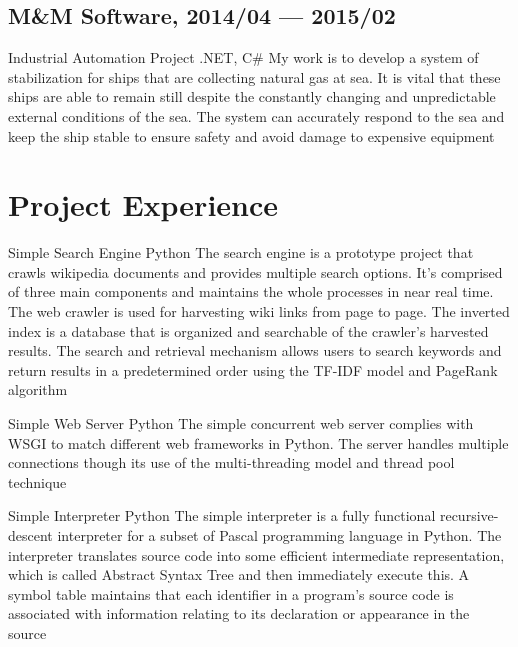 \documentclass[11pt,a4paper]{moderncv}
\begin{document}
\subsection{M\&M Software, 2014/04 --- 2015/02}
\renewcommand{\baselinestretch}{1.0}
\cventry{}
{Industrial Automation Project}
{.NET, C\#}
{}{}
{
My work is to develop a system of stabilization for ships that are collecting natural gas at sea. It is vital that these ships are able to remain still despite the constantly changing and unpredictable external conditions of the sea. The system can accurately respond to the sea and keep the ship stable to ensure safety and avoid damage to expensive equipment
}


\section{Project Experience}
\cventry{}
{Simple Search Engine}
{Python}
{}{}
{
The search engine is a prototype project that crawls wikipedia documents and provides multiple search options. It's comprised of three main components and maintains the whole processes in near real time. The web crawler is used for harvesting wiki links from page to page. The inverted index is a database that is organized and searchable of the crawler's harvested results. The search and retrieval mechanism allows users to search keywords and return results in a predetermined order using the TF-IDF model and PageRank algorithm
}

\vspace*{0.2\baselineskip}
\cventry{}
{Simple Web Server}
{Python}
{}{}
{
The simple concurrent web server complies with WSGI to match different web frameworks in Python. The server handles multiple connections though its use of the multi-threading model and thread pool technique
}

\vspace*{0.2\baselineskip}
\cventry{}
{Simple Interpreter}
{Python}
{}{}
{
The simple interpreter is a fully functional recursive-descent interpreter for a subset of Pascal programming language in Python. The interpreter translates source code into some efficient intermediate representation, which is called Abstract Syntax Tree and then immediately execute this. A symbol table maintains that each identifier in a program's source code is associated with information relating to its declaration or appearance in the source
}
\end{document}

